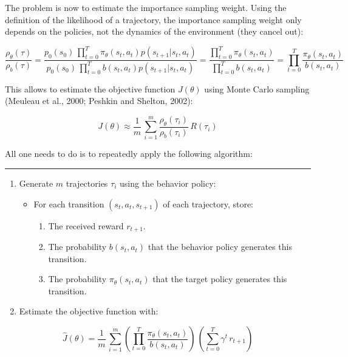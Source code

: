 \documentclass[
  letterpaper,
  DIV=11,
  numbers=noendperiod]{scrreprt}
\begin{document}
The problem is now to estimate the importance sampling weight. Using the
definition of the likelihood of a trajectory, the importance sampling
weight only depends on the policies, not the dynamics of the environment
(they cancel out):

\[
    \frac{\rho_\theta(\tau)}{\rho_b(\tau)} = \frac{p_0 (s_0) \, \prod_{t=0}^T \pi_\theta(s_t, a_t) p(s_{t+1} | s_t, a_t)}{p_0 (s_0) \, \prod_{t=0}^T b(s_t, a_t) p(s_{t+1} | s_t, a_t)} = \frac{\prod_{t=0}^T \pi_\theta(s_t, a_t)}{\prod_{t=0}^T b(s_t, a_t)} = \prod_{t=0}^T \frac{\pi_\theta(s_t, a_t)}{b(s_t, a_t)}
\]

This allows to estimate the objective function \(J(\theta)\) using Monte
Carlo sampling (Meuleau et al., 2000; Peshkin and Shelton, 2002):

\[
  J(\theta) \approx \frac{1}{m} \, \sum_{i=1}^m \frac{\rho_\theta(\tau_i)}{\rho_b(\tau_i)} \, R(\tau_i)
\]

All one needs to do is to repeatedly apply the following algorithm:

\begin{center}\rule{0.5\linewidth}{0.5pt}\end{center}

\begin{enumerate}
\def\labelenumi{\arabic{enumi}.}
\item
  Generate \(m\) trajectories \(\tau_i\) using the behavior policy:

  \begin{itemize}
  \item
    For each transition \((s_t, a_t, s_{t+1})\) of each trajectory,
    store:

    \begin{enumerate}
    \def\labelenumii{\arabic{enumii}.}
    \item
      The received reward \(r_{t+1}\).
    \item
      The probability \(b(s_t, a_t)\) that the behavior policy generates
      this transition.
    \item
      The probability \(\pi_\theta(s_t, a_t)\) that the target policy
      generates this transition.
    \end{enumerate}
  \end{itemize}
\item
  Estimate the objective function with:
\end{enumerate}

\[
  \hat{J}(\theta) = \frac{1}{m} \, \sum_{i=1}^m \left(\prod_{t=0}^T \frac{\pi_\theta(s_t, a_t)}{b(s_t, a_t)} \right) \, \left(\sum_{t=0}^T \gamma^t \, r_{t+1} \right)
\]
\end{document}

